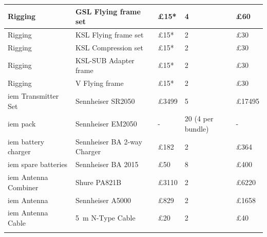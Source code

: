 \begin{longtable}[H]{|p{3cm}|p{4cm}|p{2cm}|p{3cm}|p{2cm}|}
Rigging                            & GSL Flying frame set               & £15*                          & 4                                  & £60    \\ \hline
Rigging                            & KSL Flying frame set               & £15*                          & 2                                  & £30    \\ \hline
Rigging                            & KSL Compression set                & £15*                          & 2                                  & £30    \\ \hline
Rigging                            & KSL-SUB Adapter frame              & £15*                          & 2                                  & £30    \\ \hline
Rigging                            & V Flying frame                     & £15*                          & 2                                  & £30    \\ \hline
\rowcolor[HTML]{EFEFEF} 
\acrshort{iem} Transmitter Set     & Sennheiser SR2050                  & £3499                         & 5                                  & £17495 \\ \hline
\rowcolor[HTML]{EFEFEF} 
\acrshort{iem} pack                & Sennheiser EM2050                  & -                             & 20 (4 per bundle)                  & -      \\ \hline
\rowcolor[HTML]{EFEFEF} 
\acrshort{iem} battery charger     & Sennheiser BA 2-way Charger        & £182                          & 2                                  & £364   \\ \hline
\rowcolor[HTML]{EFEFEF} 
\acrshort{iem} spare batteries     & Sennheiser BA 2015                 & £50                           & 8                                  & £400   \\ \hline
\rowcolor[HTML]{EFEFEF} 
\acrshort{iem} Antenna Combiner    & Shure PA821B                       & £3110                         & 2                                  & £6220  \\ \hline
\rowcolor[HTML]{EFEFEF} 
\acrshort{iem} Antenna             & Sennheiser A5000                   & £829                          & 2                                  & £1658  \\ \hline
\rowcolor[HTML]{EFEFEF} 
\acrshort{iem} Antenna Cable       & \SI{5}{\metre} N-Type Cable        & £20                           & 2                                  & £40    \\ \hline
\rowcolor[HTML]{EFEFEF} 

\end{longtable}
